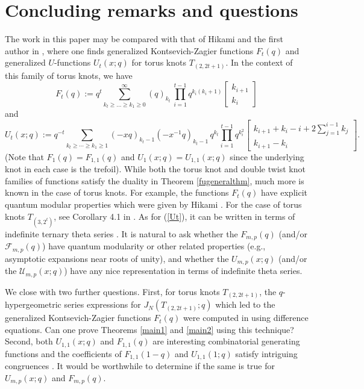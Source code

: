 \documentclass[11pt,reqno]{amsart}
\theoremstyle{definition}
\numberwithin{equation}{section}
\begin{document}
\section{Concluding remarks and questions}
The work in this paper may be compared with that of Hikami and the first author in \cite{hikami1,hikami2,hl1}, where one finds generalized Kontsevich-Zagier functions $F_t(q)$ and generalized $U$-functions $U_t(x;q)$ for torus knots $T_{(2,2t+1)}$. In the context of this family of torus knots, we have
\begin{equation} \label{Ft}
F_t(q) := 
  q^{t}
  \sum_{k_t \geq \dots \geq k_1 \geq 0}^\infty
  (q)_{k_t} \, 
  \prod_{i=1}^{t-1} q^{k_i(k_i+1)} 
  \begin{bmatrix}
    k_{i+1} \\
    k_i
  \end{bmatrix} 
\end{equation} 
and 
\begin{equation} \label{Ut}
U_t(x;q) :=
  q^{-t}
  \sum_{k_t  \geq \cdots \geq k_1 \geq 1}
  (-xq)_{k_t-1}(-x^{-1}q)_{k_t-1} \,
  q^{k_t}\prod_{i=1}^{t-1} q^{k_i^2}
  \begin{bmatrix}
    k_{i+1} + k_i - i   + 2\sum_{j=1}^{i-1}k_j \\
    k_{i+1} - k_i
  \end{bmatrix}.
\end{equation}
(Note that $F_1(q) = F_{1,1}(q)$ and $U_1(x;q) = U_{1,1}(x;q)$ since the underlying knot in each case is the trefoil).
While both the torus knot and double twist knot families of functions satisfy the duality in Theorem \ref{fugeneralthm}, much more is known in the case of torus knots.   For example, the functions $F_t(q)$ have explicit quantum modular properties which were given by Hikami \cite{hikami2}. For the case of torus knots $T_{(3, 2^t)}$, see Corollary 4.1 in \cite{go}. As for (\ref{Ut}), it can be written in terms of indefinite ternary theta series \cite{hl1}. It is natural to ask whether the $F_{m,p}(q)$ (and/or $\mathcal{F}_{m,p}(q)$) have quantum modularity or other related properties (e.g., asymptotic expansions near roots of unity), and whether the $U_{m,p}(x;q)$ (and/or the $\mathcal{U}_{m,p}(x;q)$) have any nice representation in terms of indefinite theta series. 

We close with two further questions.   First, for torus knots $T_{(2, 2t+1)}$, the $q$-hypergeometric series expressions for $J_N(T_{(2,2t+1)};q)$ which led to the generalized Kontsevich-Zagier functions $F_t(q)$  were computed in \cite{hikami1, hikami2} using difference equations.  Can one prove  Theorems \ref{main1} and \ref{main2} using this technique?   Second,  both $U_{1,1}(x; q)$ and $F_{1,1}(q)$ are interesting combinatorial generating functions and the coefficients of $F_{1,1}(1-q)$ and $U_{1,1}(1; q)$ satisfy intriguing congruences \cite{ak, as, bopr, garvan, gkr, straub}.  It would be worthwhile to determine if the same is true for $U_{m,p}(x; q)$ and $F_{m,p}(q)$.  
\end{document}
